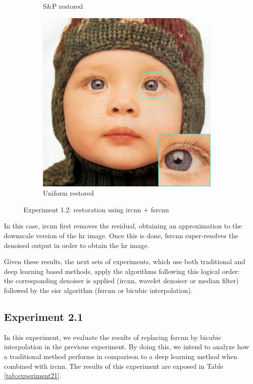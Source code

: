\begin{figure}
\begin{subfigure}{0.24\textwidth}
		\caption{S\&P restored}
	\end{subfigure}
	\begin{subfigure}{0.24\textwidth}
		\includegraphics[width=\textwidth]{images/exp1.2/uniform.png}
		\caption{Uniform restored}
	\end{subfigure}
	\caption{Experiment 1.2: restoration using \gls{ircnn} $+$ \gls{fsrcnn}}
	\label{fig:exp1.2}
\end{figure}

In this case, \gls{ircnn} first removes the residual, obtaining an approximation to the downscale version of the \gls{hr} image. Once this is done, \gls{fsrcnn} super-resolves the denoised output in order to obtain the \gls{hr} image. 

Given these results, the next sets of experiments, which use both traditional and deep learning based methods, apply the algorithms following this logical order: the corresponding denoiser is applied (\gls{ircnn}, wavelet denoiser or median filter) followed by the \gls{sisr} algorithm (\gls{fsrcnn} or bicubic interpolation).


\newpage\subsection{Experiment 2.1}

In this experiment, we evaluate the results of replacing \gls{fsrcnn} by bicubic interpolation in the previous experiment. By doing this, we intend to analyze how a traditional method performs in comparison to a deep learning method when combined with \gls{ircnn}. The results of this experiment are exposed in Table \ref{tab:experiment21}.

